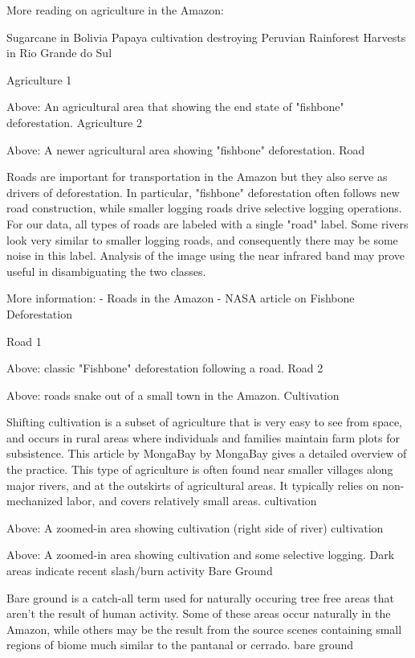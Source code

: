 More reading on agriculture in the Amazon:

    Sugarcane in Bolivia
    Papaya cultivation destroying Peruvian Rainforest
    Harvests in Rio Grande do Sul

Agriculture 1

Above: An agricultural area that showing the end state of "fishbone" deforestation. Agriculture 2

Above: A newer agricultural area showing "fishbone" deforestation.
Road

Roads are important for transportation in the Amazon but they also serve as drivers of deforestation. In particular, "fishbone" deforestation often follows new road construction, while smaller logging roads drive selective logging operations. For our data, all types of roads are labeled with a single "road" label. Some rivers look very similar to smaller logging roads, and consequently there may be some noise in this label. Analysis of the image using the near infrared band may prove useful in disambiguating the two classes.

More information: - Roads in the Amazon - NASA article on Fishbone Deforestation

Road 1

Above: classic "Fishbone" deforestation following a road. Road 2

Above: roads snake out of a small town in the Amazon.
Cultivation

Shifting cultivation is a subset of agriculture that is very easy to see from space, and occurs in rural areas where individuals and families maintain farm plots for subsistence. This article by MongaBay by MongaBay gives a detailed overview of the practice. This type of agriculture is often found near smaller villages along major rivers, and at the outskirts of agricultural areas. It typically relies on non-mechanized labor, and covers relatively small areas. cultivation

Above: A zoomed-in area showing cultivation (right side of river) cultivation

Above: A zoomed-in area showing cultivation and some selective logging. Dark areas indicate recent slash/burn activity
Bare Ground

Bare ground is a catch-all term used for naturally occuring tree free areas that aren't the result of human activity. Some of these areas occur naturally in the Amazon, while others may be the result from the source scenes containing small regions of biome much similar to the pantanal or cerrado. bare ground

